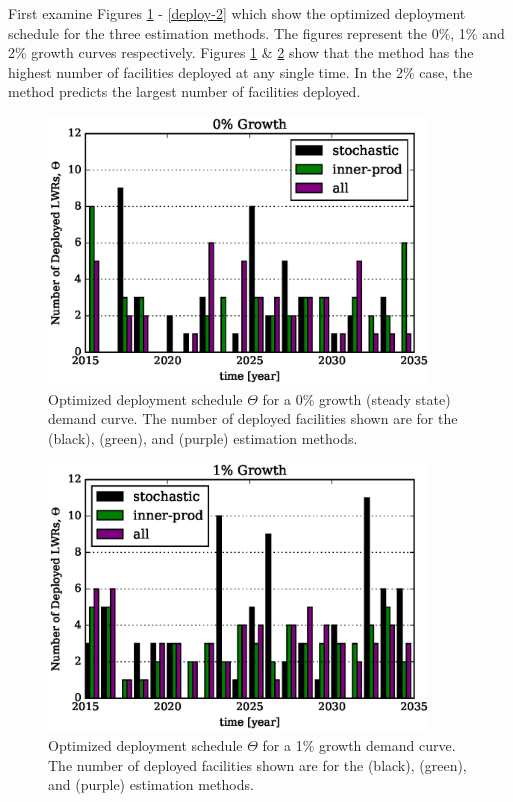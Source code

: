First examine Figures \ref{deploy-0} - \ref{deploy-2} which
show the optimized deployment schedule for the three estimation methods.
The figures represent the 0\%, 1\% and 2\% growth curves respectively.
Figures \ref{deploy-0} \& \ref{deploy-1} show that the \stochastic method
has the highest number of facilities deployed at any single time. In the 
2\% case, the \allflag method predicts the largest number of facilities 
deployed.

\begin{figure}[htb]
\centering
\includegraphics[width=0.9\textwidth]{deploy-0.eps}
\caption{Optimized deployment schedule $\Theta$ for a 0\% growth (steady 
state) demand curve. The number of deployed facilities shown are 
for the \stochastic (black), \innerprod (green), and \allflag (purple)
estimation methods.}
\label{deploy-0}
\end{figure}

\begin{figure}[htb]
\centering
\includegraphics[width=0.9\textwidth]{deploy-1.eps}
\caption{Optimized deployment schedule $\Theta$ for a 1\% growth 
demand curve. The number of deployed facilities shown are 
for the \stochastic (black), \innerprod (green), and \allflag (purple)
estimation methods.}
\label{deploy-1}
\end{figure}

